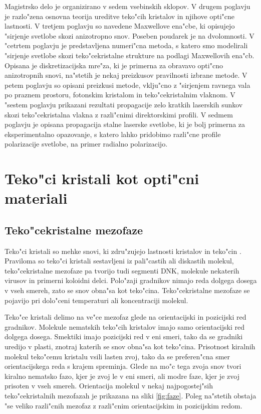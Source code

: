\documentclass[12pt,twoside,openright,final]{report}
\begin{document}
Magistrsko delo je organizirano v sedem vsebinskih sklopov. 
V drugem poglavju je razlo"zena osnovna teorija ureditve teko"cih kristalov in njihove opti"cne lastnosti. 
V tretjem poglavju so navedene Maxwellove ena"cbe, ki opisujejo "sirjenje svetlobe skozi anizotropno snov. 
Poseben poudarek je na dvolomnosti. 
V "cetrtem poglavju je predstavljena numeri"cna metoda, s katero smo modelirali "sirjenje svetlobe skozi teko"cekristalne strukture na podlagi Maxwellovih ena"cb. 
Opisana je diskretizacijska mre"za, ki je primerna za obravavo opti"cno anizotropnih snovi, na"stetih je nekaj preizkusov pravilnosti izbrane metode. 
V petem poglavju so opisani preizkusi metode, vklju"cno z "sirjenjem ravnega vala po praznem prostoru, fotonskim kristalom in teko"cekristalnim vlaknom. 
V "sestem poglavju prikazani rezultati propagacije zelo kratkih laserskih sunkov skozi teko"cekristalna vlakna z razli"cnimi direktorskimi profili. 
V sedmem poglavju je opisana propagacija stalne laserske svetlobe, ki je bolj primerna za eksperimentalno opazovanje, s katero lahko pridobimo razli"cne profile polarizacije svetlobe, na primer radialno polarizacijo. 


\chapter{Teko"ci kristali kot opti"cni materiali}

\section{Teko"cekristalne mezofaze}

Teko"ci kristali so mehke snovi, ki zdru"zujejo lastnosti kristalov in teko"cin \cite{degennes}. 
Praviloma so teko"ci kristali sestavljeni iz pali"castih ali diskastih molekul, teko"cekristalne mezofaze pa tvorijo tudi segmenti DNK, molekule nekaterih virusov in primerni koloidni delci. 
Polo"zaji gradnikov nimajo reda dolgega dosega v vseh smereh, zato se snov obna"sa kot teko"cina. 
Teko"cekristalne mezofaze se pojavijo pri dolo"ceni temperaturi ali koncentraciji molekul. 

Teko"ce kristali delimo na ve"ce mezofaz glede na orientacijski in pozicijski red gradnikov. 
Molekule nematskih teko"cih kristalov imajo samo orientacijski red dolgega dosega. 
Smektiki imajo pozicijski red v eni smeri, tako da se gradniki uredijo v plasti, znotraj katerih se snov obna"sa kot teko"cina. 
Prisotnost kiralnih molekul teko"cemu kristalu vsili lasten zvoj, tako da se preferen"cna smer orientacijskega reda s krajem spreminja. 
Glede na mo"c tega zvoja snov tvori kiralno nematsko fazo, kjer je zvoj le v eni smeri, ali modre faze, kjer je zvoj prisoten v vseh smereh. 
Orientacija molekul v nekaj najpogostej"sih teko"cekristalnih mezofazah je prikazana na sliki \ref{fig:faze}. 
Poleg na"stetih obstaja "se veliko razli"cnih mezofaz z razli"cnim orientacijskim in pozicijskim redom. 
\end{document}
